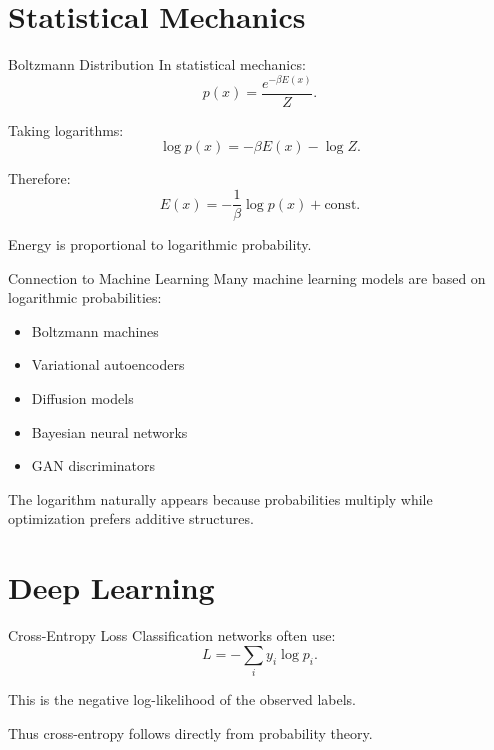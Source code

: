 \documentclass{beamer}
\begin{document}
\section{Statistical Mechanics}

\begin{frame}{Boltzmann Distribution}
In statistical mechanics:
\[
p(x)
=
\frac{e^{-\beta E(x)}}{Z}.
\]

\pause

Taking logarithms:
\[
\log p(x)
=
-\beta E(x)-\log Z.
\]

\pause

Therefore:
\[
E(x)
=
-\frac1\beta \log p(x)+\text{const}.
\]

\pause

Energy is proportional to logarithmic probability.
\end{frame}

\begin{frame}{Connection to Machine Learning}
Many machine learning models are based on logarithmic probabilities:

\begin{itemize}
\item Boltzmann machines
\item Variational autoencoders
\item Diffusion models
\item Bayesian neural networks
\item GAN discriminators
\end{itemize}

\pause

The logarithm naturally appears because probabilities multiply while optimization prefers additive structures.
\end{frame}

\section{Deep Learning}

\begin{frame}{Cross-Entropy Loss}
Classification networks often use:
\[
L
=
-
\sum_i y_i \log p_i.
\]

\pause

This is the negative log-likelihood of the observed labels.

\pause

Thus cross-entropy follows directly from probability theory.
\end{frame}
\end{document}
